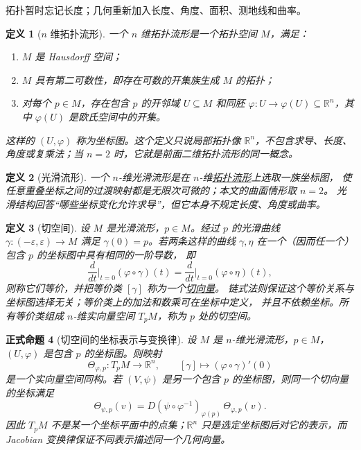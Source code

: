 \documentclass[UTF8,fontset=none,a4paper,11pt]{ctexart}
\theoremstyle{foundation-definition}
\newtheorem{definition}{定义}[section]
\theoremstyle{foundation-theorem}
\theoremstyle{foundation-proposition}
\newtheorem{proposition}[definition]{正式命题}
\theoremstyle{foundation-example}
\theoremstyle{foundation-remark}
\theoremstyle{foundation-theorem}
\newcommand{\term}[2]{\hyperref[#1]{#2}}
\begin{document}
拓扑暂时忘记长度；几何重新加入长度、角度、面积、测地线和曲率。

\begin{definition}[\(n\) 维拓扑流形]\label{def:n-dimensional-topological-manifold}
一个 \(n\) 维拓扑流形是一个拓扑空间 \(M\)，满足：
\begin{enumerate}[label=(\roman*)]
  \item \(M\) 是 Hausdorff 空间；
  \item \(M\) 具有第二可数性，即存在可数的开集族生成 \(M\) 的拓扑；
  \item 对每个 \(p\in M\)，存在包含 \(p\) 的开邻域 \(U\subseteq M\) 和同胚
  \(\varphi:U\to\varphi(U)\subseteq\mathbb R^n\)，其中 \(\varphi(U)\) 是欧氏空间中的开集。
\end{enumerate}
这样的 \((U,\varphi)\) 称为坐标图。这个定义只说局部拓扑像 \(\mathbb R^n\)，不包含求导、长度、角度或复乘法；当 \(n=2\) 时，它就是前面二维拓扑流形的同一概念。
\end{definition}

\begin{definition}[光滑流形]\label{def:smooth-manifold}
一个 \(n\)-维光滑流形是在 \(n\)-维\term{def:n-dimensional-topological-manifold}{拓扑流形}上选取一族坐标图，
使任意重叠坐标之间的过渡映射都是无限次可微的；本文的曲面情形取 \(n=2\)。
光滑结构回答“哪些坐标变化允许求导”，但它本身不规定长度、角度或曲率。
\end{definition}

\begin{definition}[切空间]\label{def:tangent-space}
设 \(M\) 是光滑流形，\(p\in M\)。经过 \(p\) 的光滑曲线
\(\gamma:(-\varepsilon,\varepsilon)\to M\) 满足 \(\gamma(0)=p\)。若两条这样的曲线
\(\gamma,\eta\) 在一个（因而任一个）包含 \(p\) 的坐标图中具有相同的一阶导数，
即
\[
\frac{d}{dt}\Big|_{t=0}(\varphi\circ\gamma)(t)
=\frac{d}{dt}\Big|_{t=0}(\varphi\circ\eta)(t),
\]
则称它们等价，并把等价类 \([\gamma]\) 称为一个\term{def:tangent-space}{切向量}。
链式法则保证这个等价关系与坐标图选择无关；等价类上的加法和数乘可在坐标中定义，
并且不依赖坐标。所有等价类组成 \(n\)-维实向量空间 \(T_pM\)，称为 \(p\) 处的切空间。
\end{definition}

\begin{proposition}[切空间的坐标表示与变换律]\label{prop:tangent-space-coordinate-vector}
设 \(M\) 是 \(n\)-维光滑流形，\(p\in M\)，\((U,\varphi)\) 是包含 \(p\) 的坐标图。则映射
\[
\Theta_{\varphi,p}:T_pM\longrightarrow\mathbb R^n,
\qquad
[\gamma]\longmapsto(\varphi\circ\gamma)'(0)
\]
是一个实向量空间同构。若 \((V,\psi)\) 是另一个包含 \(p\) 的坐标图，则同一个切向量的坐标满足
\[
\Theta_{\psi,p}(v)
=D(\psi\circ\varphi^{-1})_{\varphi(p)}\,\Theta_{\varphi,p}(v).
\]
因此 \(T_pM\) 不是某一个坐标平面中的点集；\(\mathbb R^n\) 只是选定坐标图后对它的表示，而 Jacobian 变换律保证不同表示描述同一个几何向量。
\end{proposition}
\end{document}
